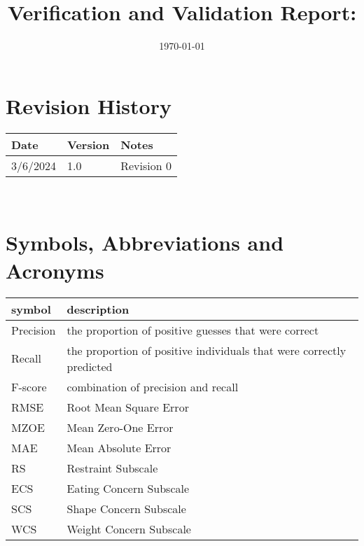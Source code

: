 \documentclass[12pt, titlepage]{article}
\begin{document}
\title{Verification and Validation Report: \progname} 
\author{\authname}
\date{\today}
	
\maketitle


\section{Revision History}

\begin{tabularx}{\textwidth}{p{3cm}p{2cm}X}
\toprule {\bf Date} & {\bf Version} & {\bf Notes}\\
\midrule
3/6/2024 & 1.0 & Revision 0\\
\bottomrule
\end{tabularx}

~\newpage

\section{Symbols, Abbreviations and Acronyms}

\renewcommand{\arraystretch}{1.2}
\begin{tabular}{l l} 
  \toprule		
  \textbf{symbol} & \textbf{description}\\
  \midrule 
  Precision & the proportion of positive guesses that were correct\\
  Recall & the proportion of positive individuals that were correctly predicted\\
  F-score & combination of precision and recall\\
  RMSE & Root Mean Square Error\\
  MZOE & Mean Zero-One Error\\
  MAE & Mean Absolute Error\\
  RS & Restraint Subscale\\
  ECS & Eating Concern Subscale\\
  SCS & Shape Concern Subscale\\
  WCS & Weight Concern Subscale\\
  \bottomrule
\end{tabular}\\

\newpage

\tableofcontents

\listoftables %
\end{document}
